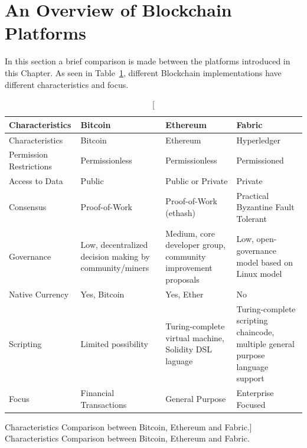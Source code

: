 \section{An Overview of Blockchain Platforms}

In this section a brief comparison is made between the platforms introduced in
this Chapter. As seen in Table~\ref{tab:blockchainComparison}, different
Blockchain implementations have different characteristics and focus.

\begin{table}[h!]
	\centering
	
	\begin{tabular}{ p{4cm} p{3.4cm} p{4cm} p{4.4cm} }
    \textbf{Characteristics} & \textbf{Bitcoin} & \textbf{Ethereum} &
    \textbf{Fabric} \\ \hline
    Characteristics & Bitcoin & Ethereum & Hyperledger \\[7pt] Permission
    Restrictions & Permissionless & Permissionless & Permissioned \\[7pt]
    Access to Data & Public & Public or Private & Private \\[7pt] Consensus &
    Proof-of-Work & Proof-of-Work (ethash) & Practical Byzantine Fault Tolerant
    \\[7pt] Governance & Low, decentralized decision making by community/miners
    & Medium, core developer group, community improvement proposals & Low,
    open-governance model based on Linux model \\[7pt] Native Currency & Yes,
    Bitcoin & Yes, Ether & No \\[7pt] Scripting & Limited possibility &
    Turing-complete virtual machine, Solidity DSL laguage & Turing-complete
    scripting chaincode, multiple general purpose language support \\[7pt]
    Focus & Financial Transactions & General Purpose & Enterprise Focused \\
		\hline
	\end{tabular}
	
	\caption
	[Characteristics Comparison between Bitcoin, Ethereum and Fabric.]
	{Characteristics Comparison between Bitcoin, Ethereum and Fabric.}
	
	\label{tab:blockchainComparison}
\end{table}

